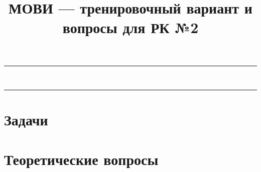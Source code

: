 \documentclass[12pt]{article}
\theoremstyle{example}
\theoremstyle{plain}
\theoremstyle{definition}
\theoremstyle{remark}
\numberwithin{remark}{section}
\newcounter{problem}
\newcommand{\HRule}{\rule{\linewidth}{0.5mm}}
\begin{document}
\title{МОВИ --- тренировочный вариант и вопросы для РК №2}
\maketitle
\tableofcontents

\vspace{1.5em}
\begin{spacing}{0.05}
\noindent
\HRule\\
\HRule
\end{spacing}

\section*{Задачи}


\section*{Теоретические вопросы}

\end{document}

